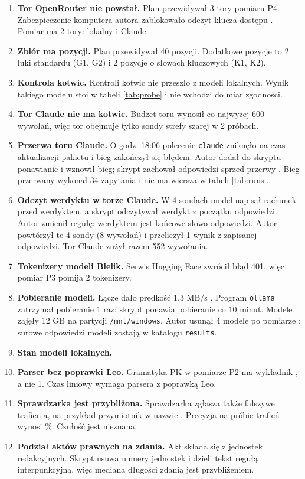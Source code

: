 \begin{enumerate}[leftmargin=1.8em,itemsep=2pt]
  \item \textbf{Tor OpenRouter nie powstał.} Plan przewidywał 3 tory pomiaru P4.
  Zabezpieczenie komputera autora zablokowało odczyt klucza dostępu
  \pkq{[obserwacja: 2026-11-12, 15:15]}. Pomiar ma 2 tory: lokalny i Claude.
  \item \textbf{Zbiór ma \pkItems{} pozycji.} Plan przewidywał 40 pozycji. Dodatkowe
  pozycje to 2 luki standardu (G1, G2) i 2 pozycje o słowach kluczowych (K1, K2).
  \item \textbf{Kontrola kotwic.} Kontroli kotwic nie przeszło \pkProbeFailed{}
  z \pkProbeLocal{} modeli lokalnych. Wynik takiego modelu stoi w tabeli \ref{tab:probe}
  i nie wchodzi do miar zgodności.
  \item \textbf{Tor Claude nie ma kotwic.} Budżet toru wynosił co najwyżej 600 wywołań,
  więc tor obejmuje tylko sondy strefy szarej w 2 próbach.
  \item \textbf{Przerwa toru Claude.} O godz. 18:06 polecenie \texttt{claude} zniknęło na
  czas aktualizacji pakietu i bieg zakończył się błędem. Autor dodał do skryptu ponawianie
  i wznowił bieg; skrypt zachował odpowiedzi sprzed przerwy
  \pkq{[obserwacja: 2026-11-12, 18:07]}. Bieg przerwany wykonał 34 zapytania i nie ma
  wiersza w tabeli \ref{tab:runs}.
  \item \textbf{Odczyt werdyktu w torze Claude.} W 4 sondach model napisał rachunek przed
  werdyktem, a skrypt odczytywał werdykt z początku odpowiedzi. Autor zmienił regułę:
  werdyktem jest końcowe słowo odpowiedzi. Autor powtórzył te 4 sondy (8 wywołań)
  i przeliczył 1 wynik z zapisanej odpowiedzi. Tor Claude zużył razem 552 wywołania.
  \item \textbf{Tokenizery modeli Bielik.} Serwis Hugging Face zwrócił błąd 401, więc
  pomiar P3 pomija 2 tokenizery.
  \item \textbf{Pobieranie modeli.} Łącze dało prędkość 1,3 MB/s \pkq{[obserwacja:
  2026-11-12, 17:41]}. Program \texttt{ollama} zatrzymał pobieranie 1 raz; skrypt ponawia
  pobieranie co 10 minut. Modele zajęły 12 GB na partycji \texttt{/mnt/windows}. Autor usunął 4 modele po
  pomiarze \pkq{[obserwacja: 2026-11-12, 20:41]}; surowe odpowiedzi modeli zostają
  w katalogu \texttt{results}.
  \item \textbf{Stan modeli lokalnych.} 
  \item \textbf{Parser bez poprawki Leo.} Gramatyka PK w pomiarze P2 ma wykładnik
  \pkParseExpPk{}, a nie 1. Czas liniowy wymaga parsera z poprawką Leo.
  \item \textbf{Sprawdzarka jest przybliżona.} Sprawdzarka zgłasza także fałszywe
  trafienia, na przykład przymiotnik w nazwie . Precyzja na próbie
  \pkPrecN{} trafień wynosi \pkPrec{} \%. Czułość jest nieznana.
  \item \textbf{Podział aktów prawnych na zdania.} Akt składa się z jednostek
  redakcyjnych. Skrypt usuwa numery jednostek i dzieli tekst regułą interpunkcyjną, więc
  mediana długości zdania jest przybliżeniem.
\end{enumerate}
